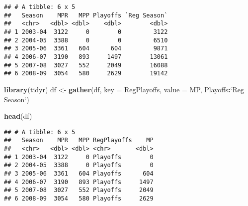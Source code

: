\documentclass[]{book}
\newenvironment{Shaded}{\begin{snugshade}}{\end{snugshade}}
\newcommand{\DataTypeTok}[1]{\textcolor[rgb]{0.13,0.29,0.53}{#1}}
\newcommand{\KeywordTok}[1]{\textcolor[rgb]{0.13,0.29,0.53}{\textbf{#1}}}
\newcommand{\NormalTok}[1]{#1}
\newcommand{\OperatorTok}[1]{\textcolor[rgb]{0.81,0.36,0.00}{\textbf{#1}}}
\newcommand{\StringTok}[1]{\textcolor[rgb]{0.31,0.60,0.02}{#1}}
\begin{document}
\begin{verbatim}
## # A tibble: 6 x 5
##   Season    MPR   MPP Playoffs `Reg Season`
##   <chr>   <dbl> <dbl>    <dbl>        <dbl>
## 1 2003-04  3122     0        0         3122
## 2 2004-05  3388     0        0         6510
## 3 2005-06  3361   604      604         9871
## 4 2006-07  3190   893     1497        13061
## 5 2007-08  3027   552     2049        16088
## 6 2008-09  3054   580     2629        19142
\end{verbatim}

\begin{Shaded}
\begin{Highlighting}[]
\KeywordTok{library}\NormalTok{(tidyr)}
\NormalTok{df <-}\StringTok{ }\KeywordTok{gather}\NormalTok{(df, }\DataTypeTok{key =}\NormalTok{ RegPlayoffs, }\DataTypeTok{value =}\NormalTok{ MP, Playoffs}\OperatorTok{:}\StringTok{`}\DataTypeTok{Reg Season}\StringTok{`}\NormalTok{) }

\KeywordTok{head}\NormalTok{(df)}
\end{Highlighting}
\end{Shaded}

\begin{verbatim}
## # A tibble: 6 x 5
##   Season    MPR   MPP RegPlayoffs    MP
##   <chr>   <dbl> <dbl> <chr>       <dbl>
## 1 2003-04  3122     0 Playoffs        0
## 2 2004-05  3388     0 Playoffs        0
## 3 2005-06  3361   604 Playoffs      604
## 4 2006-07  3190   893 Playoffs     1497
## 5 2007-08  3027   552 Playoffs     2049
## 6 2008-09  3054   580 Playoffs     2629
\end{verbatim}
\end{document}
